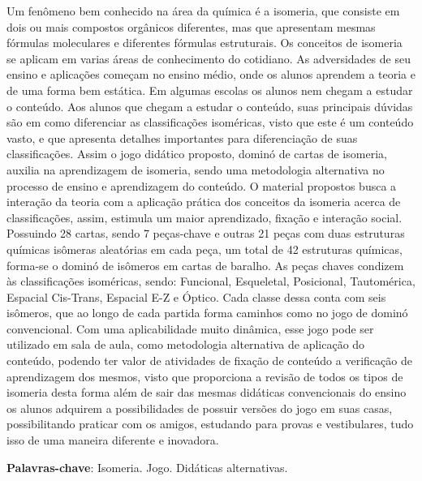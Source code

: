 \documentclass[article,12pt,onesidea,4paper,english,brazil]{abntex2}
\begin{document}
	\noindent Um fenômeno bem conhecido na área da química é a isomeria, que consiste em
	dois ou mais compostos orgânicos diferentes, mas que apresentam mesmas
	fórmulas moleculares e diferentes fórmulas estruturais. Os conceitos de isomeria se
	aplicam em varias áreas de conhecimento do cotidiano. As adversidades de seu
	ensino e aplicações começam no ensino médio, onde os alunos aprendem a teoria e
	de uma forma bem estática. Em algumas escolas os alunos nem chegam a estudar
	o conteúdo. Aos alunos que chegam a estudar o conteúdo, suas principais dúvidas
	são em como diferenciar as classificações isoméricas, visto que este é um conteúdo
	vasto, e que apresenta detalhes importantes para diferenciação de suas
	classificações. Assim o jogo didático proposto, dominó de cartas de isomeria, auxilia
	na aprendizagem de isomeria, sendo uma metodologia alternativa no processo de
	ensino e aprendizagem do conteúdo. O material propostos busca a interação da
	teoria com a aplicação prática dos conceitos da isomeria acerca de classificações,
	assim, estimula um maior aprendizado, fixação e interação social. Possuindo 28
	cartas, sendo 7 peças-chave e outras 21 peças com duas estruturas químicas
	isômeras aleatórias em cada peça, um total de 42 estruturas químicas, forma-se o
	dominó de isômeros em cartas de baralho. As peças chaves condizem às
	classificações isoméricas, sendo: Funcional, Esqueletal, Posicional, Tautomérica,
	Espacial Cis-Trans, Espacial E-Z e Óptico. Cada classe dessa conta com seis
	isômeros, que ao longo de cada partida forma caminhos como no jogo de dominó
	convencional. Com uma aplicabilidade muito dinâmica, esse jogo pode ser utilizado
	em sala de aula, como metodologia alternativa de aplicação do conteúdo, podendo
	ter valor de atividades de fixação de conteúdo a verificação de aprendizagem dos
	mesmos, visto que proporciona a revisão de todos os tipos de isomeria desta forma
	além de sair das mesmas didáticas convencionais do ensino os alunos adquirem a
	possibilidades de possuir versões do jogo em suas casas, possibilitando praticar
	com os amigos, estudando para provas e vestibulares, tudo isso de uma maneira
	diferente e inovadora.
	
	\vspace{\onelineskip}
	
	\noindent
	\textbf{Palavras-chave}: Isomeria. Jogo. Didáticas alternativas.
	
\end{document}
